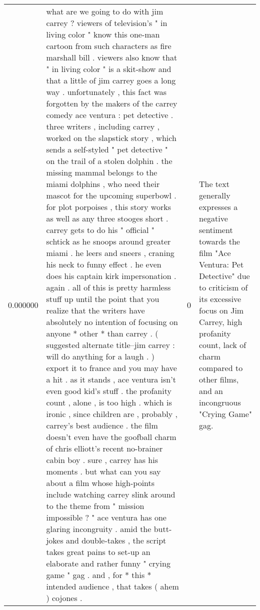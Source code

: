 \begin{tabular}{r{1cm} p{0.4in} r{1cm} p{0.4in}}
0.000000 & what are we going to do with jim carrey ?  viewers of television's " in living color " know this one-man cartoon from such characters as fire marshall bill .  viewers also know that " in living color " is a skit-show and that a little of jim carrey goes a long way .  unfortunately , this fact was forgotten by the makers of the carrey comedy ace ventura : pet detective .  three writers , including carrey , worked on the slapstick story , which sends a self-styled " pet detective " on the trail of a stolen dolphin .  the missing mammal belongs to the miami dolphins , who need their mascot for the upcoming superbowl .  for plot porpoises , this story works as well as any three stooges short .  carrey gets to do his " official " schtick as he snoops around greater miami .  he leers and sneers , craning his neck to funny effect .  he even does his captain kirk impersonation .  again .  all of this is pretty harmless stuff up until the point that you realize that the writers have absolutely no intention of focusing on anyone * other * than carrey .   ( suggested alternate title--jim carrey : will do anything for a laugh . )  export it to france and you may have a hit .  as it stands , ace ventura isn't even good kid's stuff .  the profanity count , alone , is too high .  which is ironic , since children are , probably , carrey's best audience .  the film doesn't even have the goofball charm of chris elliott's recent no-brainer cabin boy .  sure , carrey has his moments .  but what can you say about a film whose high-points include watching carrey slink around to the theme from " mission impossible ? "  ace ventura has one glaring incongruity .  amid the butt-jokes and double-takes , the script takes great pains to set-up an elaborate and rather funny " crying game " gag .  and , for * this * intended audience , that takes ( ahem ) cojones .   & 0 & The text generally expresses a negative sentiment towards the film "Ace Ventura: Pet Detective" due to criticism of its excessive focus on Jim Carrey, high profanity count, lack of charm compared to other films, and an incongruous "Crying Game" gag. \\

\end{tabular}
